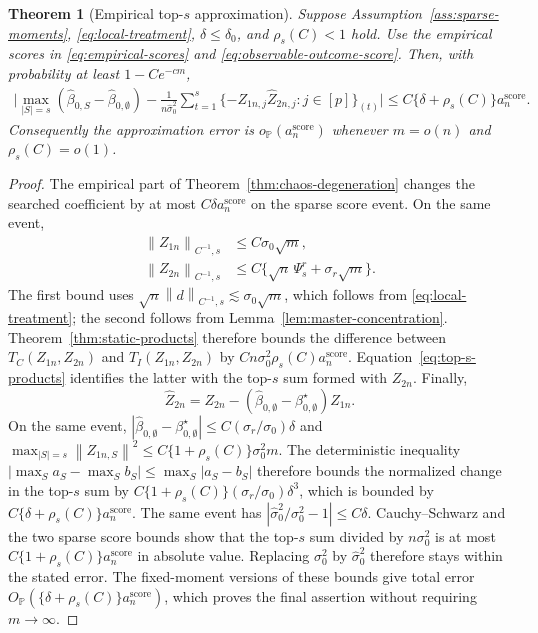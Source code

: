 \documentclass[a4paper,11pt,english]{article}
\newtheorem{theorem}{Theorem}[section]
\newcommand{\Prob}{\mathbb P}
\newcommand{\norm}[1]{\left\lVert #1\right\rVert}
\begin{document}
\begin{theorem}[Empirical top-$s$ approximation]
\label{thm:empirical-top-s}
Suppose Assumption~\ref{ass:sparse-moments},
\eqref{eq:local-treatment}, $\delta\le\delta_0$, and
$\rho_s(C)<1$ hold.  Use the empirical scores in
\eqref{eq:empirical-scores} and \eqref{eq:observable-outcome-score}.
Then, with probability at least $1-Ce^{-cm}$,
\begin{equation}\label{eq:empirical-top-s}
\begin{split}
\bigg|\max_{|S|=s}
        (\hat\beta_{0,S}-\hat\beta_{0,\emptyset})
        -\frac1{n\hat\sigma_0^2}
        \sum_{t=1}^s
        \{-Z_{1n,j}\hat Z_{2n,j}:j\in[p]\}_{(t)}\bigg|
        \le C\{\delta+\rho_s(C)\}a_n^{\mathrm{score}}.
\end{split}
\end{equation}
Consequently the approximation error is
$o_{\Prob}(a_n^{\mathrm{score}})$ whenever
$m=o(n)$ and $\rho_s(C)=o(1)$.
\end{theorem}

\begin{proof}
The empirical part of Theorem~\ref{thm:chaos-degeneration} changes the
searched coefficient by at most $C\delta a_n^{\mathrm{score}}$ on the
sparse score event.  On the same event,
\begin{align*}
        \norm{Z_{1n}}_{C^{-1},s}&\le C\sigma_0\sqrt m,\\
        \norm{Z_{2n}}_{C^{-1},s}&\le
        C\{\sqrt n\,\Psi_s^r+\sigma_r\sqrt m\}.
\end{align*}
The first bound uses
$\sqrt n\norm{d}_{C^{-1},s}\lesssim\sigma_0\sqrt m$, which follows from
\eqref{eq:local-treatment}; the second follows from
Lemma~\ref{lem:master-concentration}.  Theorem~\ref{thm:static-products}
therefore bounds the difference between $T_C(Z_{1n},Z_{2n})$ and
$T_I(Z_{1n},Z_{2n})$ by
$Cn\sigma_0^2\rho_s(C)a_n^{\mathrm{score}}$.
Equation~\eqref{eq:top-s-products} identifies the latter with the
top-$s$ sum formed with $Z_{2n}$.  Finally,
\begin{equation*}
        \hat Z_{2n}
        =Z_{2n}-(\hat\beta_{0,\emptyset}-\beta_{0,\emptyset}^\star)Z_{1n}.
\end{equation*}
On the same event,
$|\hat\beta_{0,\emptyset}-\beta_{0,\emptyset}^\star|\le
C(\sigma_r/\sigma_0)\delta$ and
$\max_{|S|=s}\norm{Z_{1n,S}}^2
\le C\{1+\rho_s(C)\}\sigma_0^2m$.  The deterministic inequality
$|\max_S a_S-\max_S b_S|\le\max_S|a_S-b_S|$ therefore bounds the
normalized change in the top-$s$ sum by
$C\{1+\rho_s(C)\}(\sigma_r/\sigma_0)\delta^3$, which is bounded by
$C\{\delta+\rho_s(C)\}a_n^{\mathrm{score}}$.
The same event has
$|\hat\sigma_0^2/\sigma_0^2-1|\le C\delta$.  Cauchy--Schwarz and
the two sparse score bounds show that the top-$s$ sum divided by
$n\sigma_0^2$ is at most
$C\{1+\rho_s(C)\}a_n^{\mathrm{score}}$ in absolute value.  Replacing
$\sigma_0^2$ by $\hat\sigma_0^2$ therefore stays within the stated
error.  The fixed-moment versions of these bounds give total error
$O_{\Prob}(\{\delta+\rho_s(C)\}a_n^{\mathrm{score}})$, which proves the
final assertion without requiring $m\to\infty$.
\end{proof}
\end{document}
